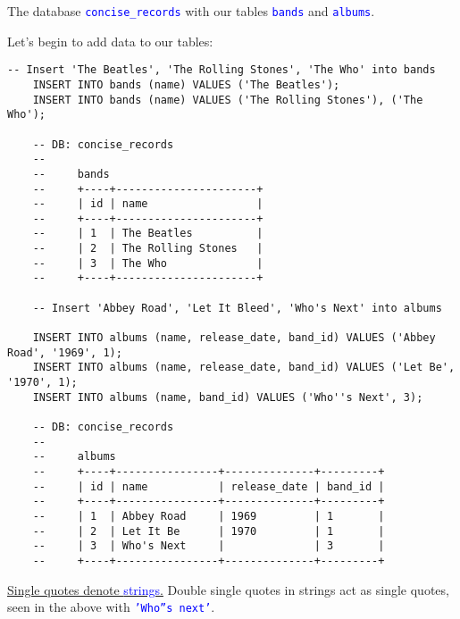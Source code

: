 \noindent
The database \textcolor{blue}{\texttt{concise\_records}} with our tables \textcolor{blue}{\texttt{bands}} and \textcolor{blue}{\texttt{albums}}.\\

\newpage

\noindent
Let's begin to add data to our tables:

\begin{lstlisting}[style=sql]
    -- Insert 'The Beatles', 'The Rolling Stones', 'The Who' into bands
    INSERT INTO bands (name) VALUES ('The Beatles');
    INSERT INTO bands (name) VALUES ('The Rolling Stones'), ('The Who');

    -- DB: concise_records
    --
    --     bands
    --     +----+----------------------+
    --     | id | name                 |
    --     +----+----------------------+
    --     | 1  | The Beatles          |
    --     | 2  | The Rolling Stones   |
    --     | 3  | The Who              |
    --     +----+----------------------+

    -- Insert 'Abbey Road', 'Let It Bleed', 'Who's Next' into albums

    INSERT INTO albums (name, release_date, band_id) VALUES ('Abbey Road', '1969', 1);
    INSERT INTO albums (name, release_date, band_id) VALUES ('Let Be', '1970', 1);
    INSERT INTO albums (name, band_id) VALUES ('Who''s Next', 3);

    -- DB: concise_records
    --
    --     albums
    --     +----+----------------+--------------+---------+
    --     | id | name           | release_date | band_id |
    --     +----+----------------+--------------+---------+
    --     | 1  | Abbey Road     | 1969         | 1       |
    --     | 2  | Let It Be      | 1970         | 1       |
    --     | 3  | Who's Next     |              | 3       |
    --     +----+----------------+--------------+---------+

\end{lstlisting}


\noindent
\underline{Single quotes denote \textcolor{blue}{strings}.} Double single quotes in strings act as single quotes, seen in
the above with \textcolor{blue}{\texttt{'Who''s next'}}.\\







